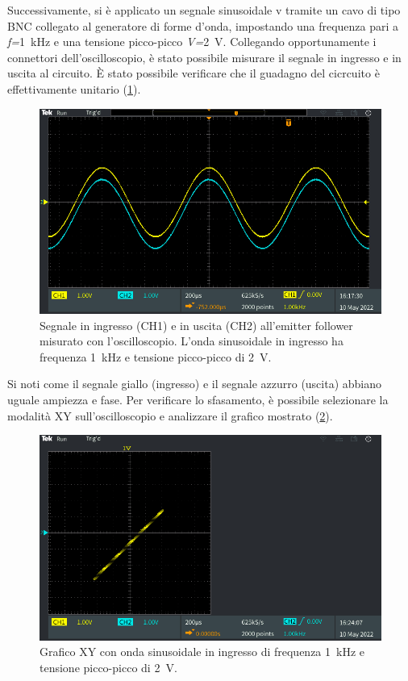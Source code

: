 Successivamente, si è applicato un segnale sinusoidale v tramite un cavo di tipo BNC collegato al generatore di forme d'onda, impostando una frequenza pari a \textit{f=}\SI{1}{\kilo\hertz} e una tensione picco-picco \textit{V=}\SI{2}{\volt}. Collegando opportunamente i connettori dell'oscilloscopio, è stato possibile misurare il segnale in ingresso e in uscita al circuito. \`E stato possibile verificare che il guadagno del cicrcuito è effettivamente unitario (\Fig\ref{fig:emitterfollwer_oscilloscopio_1}).
\begin{figure}[t]
	\centering
	\includegraphics[width=0.7\linewidth]{./ImageFiles/Laboratorio 1/TEK00005}
	\caption{Segnale in ingresso (CH1) e in uscita (CH2) all'emitter follower misurato con l'oscilloscopio. L'onda sinusoidale in ingresso ha frequenza \SI{1}{\kilo\hertz} e tensione picco-picco di \SI{2}{\volt}.}
	\label{fig:emitterfollwer_oscilloscopio_1}
\end{figure}
Si noti come il segnale giallo (ingresso) e il segnale azzurro (uscita) abbiano uguale ampiezza e fase. Per verificare lo sfasamento, è possibile selezionare la modalità XY sull'oscilloscopio e analizzare il grafico mostrato (\Fig\ref{fig:emitterfollwer_XY_1}).
\begin{figure}[h!]
	\centering
	\includegraphics[width=0.7\linewidth]{./ImageFiles/Laboratorio 1/TEK00008}
	\caption{Grafico XY con onda sinusoidale in ingresso di frequenza \SI{1}{\kilo\hertz} e tensione picco-picco di \SI{2}{\volt}.}
	\label{fig:emitterfollwer_XY_1}
\end{figure}

